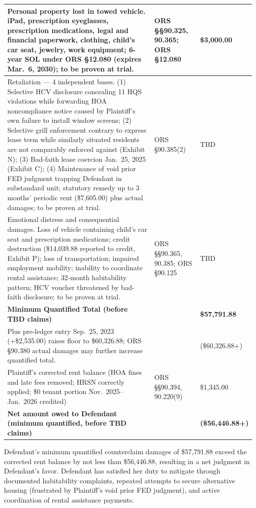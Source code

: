 \documentclass[12pt,letterpaper]{article}
\begin{document}
\begin{singlespace}
\begin{longtable}{|p{2.8in}|p{1.4in}|p{1.0in}|}
\hline
Personal property lost in towed vehicle. iPad, prescription eyeglasses, prescription medications, legal and financial paperwork, clothing, child's car seat, jewelry, work equipment; 6-year SOL under ORS \S12.080 (expires Mar.\ 6, 2030); to be proven at trial. & ORS \S\S90.325, 90.365; ORS \S12.080 & \$3,000.00 \\
\hline
Retaliation --- 4 independent bases. (1) Selective HCV disclosure concealing 11 HQS violations while forwarding HOA noncompliance notice caused by Plaintiff's own failure to install window screens; (2) Selective grill enforcement contrary to express lease term while similarly situated residents are not comparably enforced against (Exhibit N); (3) Bad-faith lease coercion Jan.\ 25, 2025 (Exhibit C); (4) Maintenance of void prior FED judgment trapping Defendant in substandard unit; statutory remedy up to 3 months' periodic rent (\$7,605.00) plus actual damages; to be proven at trial. & ORS \S90.385(2) & TBD \\
\hline
Emotional distress and consequential damages. Loss of vehicle containing child's car seat and prescription medications; credit destruction (\$14,039.88 reported to credit, Exhibit P); loss of transportation; impaired employment mobility; inability to coordinate rental assistance; 32-month habitability pattern; HCV voucher threatened by bad-faith disclosure; to be proven at trial. & ORS \S\S90.365, 90.385; ORS \S90.125 & TBD \\
\hline
\textbf{Minimum Quantified Total (before TBD claims)} & & \textbf{\$57,791.88} \\
\hline
Plus pre-ledger entry Sep.\ 25, 2023 (+\$2,535.00) raises floor to \$60,326.88; ORS \S90.380 actual damages may further increase quantified total. & & (\$60,326.88+) \\
\hline
Plaintiff's corrected rent balance (HOA fines and late fees removed; HRSN correctly applied; \$0 tenant portion Nov.\ 2025--Jan.\ 2026 credited) & ORS \S\S90.394, 90.220(9) & \$1,345.00 \\
\hline
\textbf{Net amount owed to Defendant (minimum quantified, before TBD claims)} & & \textbf{(\$56,446.88+)} \\
\hline
\end{longtable}
\end{singlespace}

Defendant's minimum quantified counterclaim damages of \$57,791.88 exceed the corrected rent balance by not less than \$56,446.88, resulting in a net judgment in Defendant's favor. Defendant has satisfied her duty to mitigate through documented habitability complaints, repeated attempts to secure alternative housing (frustrated by Plaintiff's void prior FED judgment), and active coordination of rental assistance payments.
\end{document}
